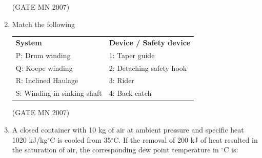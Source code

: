 \documentclass[journal]{IEEEtran}
\begin{document}
\begin{enumerate}
\begin{enumerate}
\end{enumerate}

\hfill (GATE MN 2007)

\item Match the following

\begin{tabular}{p{4.5cm} p{6cm}}
\textbf{System} & \textbf{Device / Safety device} \\
P: Drum winding & 1: Taper guide \\
Q: Koepe winding & 2: Detaching safety hook \\
R: Inclined Haulage & 3: Rider \\
S: Winding in sinking shaft & 4: Back catch \\
\end{tabular}

\begin{enumerate}
\end{enumerate}

\hfill (GATE MN 2007)

\item A closed container with 10 kg of air at ambient pressure and specific heat 1020 kJ/kg$^\circ$C is cooled from 35$^\circ$C. If the removal of 200 kJ of heat resulted in the saturation of air, the corresponding dew point temperature in $^\circ$C is:

\begin{enumerate}
\end{enumerate}


\end{enumerate}
\end{document}
